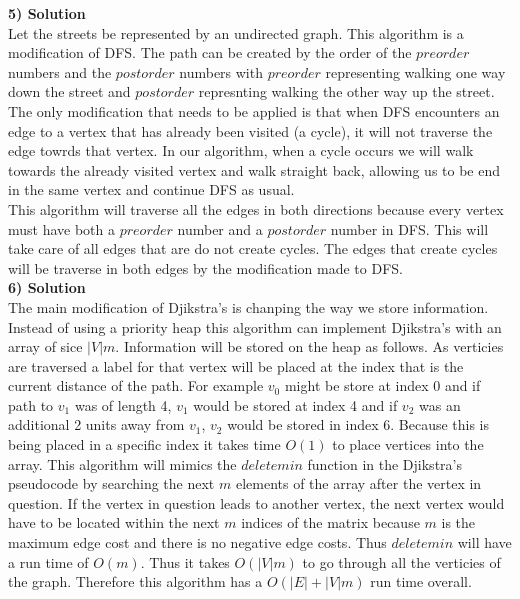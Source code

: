 \documentclass[11pt]{article}
\begin{document}
\textbf{5) Solution}\\
Let the streets be represented by an undirected graph. This algorithm is a modification of DFS. The path can be created by the order of the $preorder$ numbers and the $postorder$ numbers with $preorder$ representing walking one way down the street and $postorder$ represnting walking the other way up the street. The only modification that needs to be applied is that when DFS encounters an edge to a vertex that has already been visited (a cycle), it will not traverse the edge towrds that vertex. In our algorithm, when a cycle occurs we will walk towards the already visited vertex and walk straight back, allowing us to be end in the same vertex and continue DFS as usual. \\
This algorithm will traverse all the edges in both directions because every vertex must have both a $preorder$ number and a $postorder$ number in DFS. This will take care of all edges that are do not create cycles. The edges that create cycles will be traverse in both edges by the modification made to DFS.
\\

\textbf{6) Solution}\\
The main modification of Djikstra's is chanping the way we store information. Instead of using a priority heap this algorithm can implement Djikstra's with an array of sice $|V|m$. Information will be stored on the heap as follows. As verticies are traversed a label for that vertex will be placed at the index that is the current distance of the path. For example $v_0$ might be store at index 0 and if path to $v_1$ was of length 4, $v_1$ would be stored at index 4 and if $v_2$ was an additional 2 units away from $v_1$, $v_2$ would be stored in index 6. Because this is being placed in a specific index it takes time $O(1)$ to place vertices into the array. This algorithm will mimics the $deletemin$ function in the Djikstra's pseudocode by searching the next $m$ elements of the array after the vertex in question. If the vertex in question leads to another vertex, the next vertex would have to be located within the next $m$ indices of the matrix because $m$ is the maximum edge cost and there is no negative edge costs. Thus $deletemin$ will have a run time of $O(m)$. Thus it takes $O(|V|m)$ to go through all the verticies of the graph. Therefore this algorithm has a $O(|E|+|V|m)$ run time overall.
\end{document}
